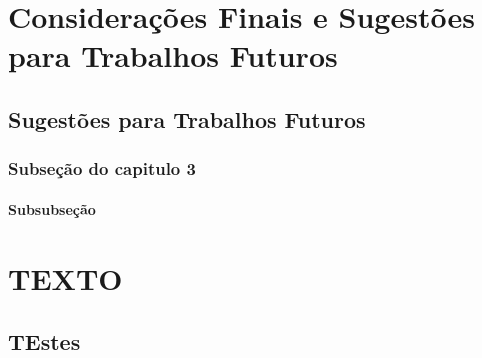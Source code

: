 \chapter{Considerações Finais e Sugestões para Trabalhos Futuros}
\label{cap:finais}


\section{Sugestões para Trabalhos Futuros}
\subsection{Subseção do capitulo 3}
\subsubsection{Subsubseção}

\label{sec:futuros}


\chapter{TEXTO}

\section{TEstes}

